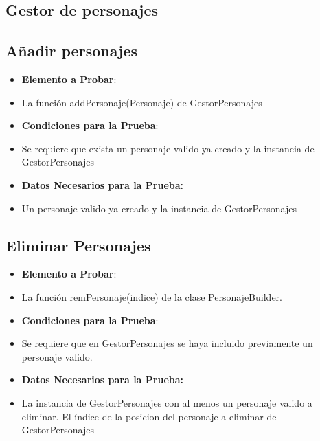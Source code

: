 \documentclass{article}
\begin{document}
\subsection{Gestor de personajes}

\subsection{Añadir personajes}
\renewcommand{\labelitemi}{}
\begin{itemize}

\item \textbf{Elemento a Probar}: 

\item La función addPersonaje(Personaje) de GestorPersonajes

\item \textbf{Condiciones para la Prueba}:

\item Se requiere que exista un personaje valido ya creado y la instancia de GestorPersonajes

\item \textbf{Datos Necesarios para la Prueba:}

\item Un personaje valido ya creado y la instancia de GestorPersonajes

\end{itemize}

\subsection{Eliminar Personajes}
\renewcommand{\labelitemi}{}
\begin{itemize}

\item \textbf{Elemento a Probar}:

\item La función remPersonaje(indice) de la clase PersonajeBuilder.

\item \textbf{Condiciones para la Prueba}:

\item Se requiere que en GestorPersonajes se haya incluido previamente un personaje valido.

\item \textbf{Datos Necesarios para la Prueba:}

\item La instancia de GestorPersonajes con al menos un personaje valido a eliminar. El índice de la posicion del personaje a eliminar de GestorPersonajes

\end{itemize}
\end{document}
